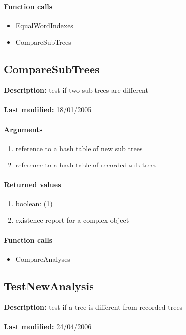 \paragraph{Function calls}
\begin{itemize}
\item EqualWordIndexes
\item CompareSubTrees
\end{itemize}

\subsection{CompareSubTrees}
\textbf{Description:} test if two sub-trees are different\\
\\\textbf{Last modified:} 18/01/2005

\paragraph{Arguments}
\begin{enumerate}
\item reference to a hash table of new sub trees
\item reference to a hash table of recorded sub trees
\end{enumerate}

\paragraph{Returned values}
\begin{enumerate}
\item boolean: (1)
\item existence report for a complex object
\end{enumerate}

\paragraph{Function calls}
\begin{itemize}
\item CompareAnalyses
\end{itemize}

\subsection{TestNewAnalysis}
\textbf{Description:} test if a tree is different from recorded trees\\
\\\textbf{Last modified:} 24/04/2006

